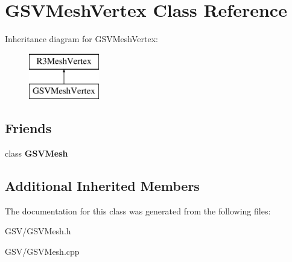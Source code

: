 \hypertarget{class_g_s_v_mesh_vertex}{}\section{G\+S\+V\+Mesh\+Vertex Class Reference}
\label{class_g_s_v_mesh_vertex}
Inheritance diagram for G\+S\+V\+Mesh\+Vertex\+:\begin{figure}[H]
\begin{center}
\leavevmode
\includegraphics[height=2.000000cm]{class_g_s_v_mesh_vertex}
\end{center}
\end{figure}
\subsection*{Friends}
\begin{DoxyCompactItemize}
\item 
class {\bfseries G\+S\+V\+Mesh}\hypertarget{class_g_s_v_mesh_vertex_a55b925404bd0cfd37a19a5aa648ec5e3}{}\label{class_g_s_v_mesh_vertex_a55b925404bd0cfd37a19a5aa648ec5e3}

\end{DoxyCompactItemize}
\subsection*{Additional Inherited Members}


The documentation for this class was generated from the following files\+:\begin{DoxyCompactItemize}
\item 
G\+S\+V/G\+S\+V\+Mesh.\+h\item 
G\+S\+V/G\+S\+V\+Mesh.\+cpp\end{DoxyCompactItemize}
